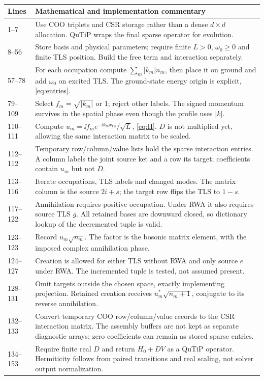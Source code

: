 \paragraph{}

\begin{longtable}{p{}p{}}
\toprule Lines & Mathematical and implementation commentary\\\midrule\endhead
1--7 & Use COO triplets and CSR storage rather than a dense $d\times d$ allocation. QuTiP wraps the final sparse operator for evolution.\\
8--56 & Store basis and physical parameters; require finite $L>0$, $\omega_0\geq0$ and finite TLS position. Build the free term and interaction separately.\\
57--78 & For each occupation compute $\sum_m|k_m|n_m$, then place it on ground and add $\omega_0$ on excited TLS. The ground-state energy origin is explicit, \eqref{eq:entries}.\\
79--109 & Select $f_m=\sqrt{|k_m|}$ or $1$; reject other labels. The signed momentum survives in the spatial phase even though the profile uses $|k|$.\\
110--111 & Compute $u_m=\ii f_m e^{-\ii k_mx_{\mathrm{tls}}}/\sqrt L$, \eqref{eq:H}. $D$ is not multiplied yet, allowing the same interaction matrix to be scaled.\\
112--112 & Temporary row/column/value lists hold the sparse interaction entries. A column labels the joint source ket and a row its target; coefficients contain $u_m$ but not $D$.\\
113--116 & Iterate occupations, TLS labels and changed modes. The matrix column is the source $2i+s$; the target row flips the TLS to $1-s$.\\
117--122 & Annihilation requires positive occupation. Under RWA it also requires source TLS $g$. All retained bases are downward closed, so dictionary lookup of the decremented tuple is valid.\\
123--123 & Record $u_m\sqrt{n_m}$. The factor is the bosonic matrix element, with the imposed complex annihilation phase.\\
124--127 & Creation is allowed for either TLS without RWA and only source $e$ under RWA. The incremented tuple is tested, not assumed present.\\
128--131 & Omit targets outside the chosen space, exactly implementing projection. Retained creation receives $u_m^*\sqrt{n_m+1}$, conjugate to its reverse annihilation.\\
132--133 & Convert temporary COO row/column/value records to the CSR interaction matrix. The assembly buffers are not kept as separate diagnostic arrays; zero coefficients can remain as stored sparse entries.\\
134--153 & Require finite real $D$ and return $H_0+DV$ as a QuTiP operator. Hermiticity follows from paired transitions and real scaling, not solver output normalization.\\
\bottomrule\end{longtable}
